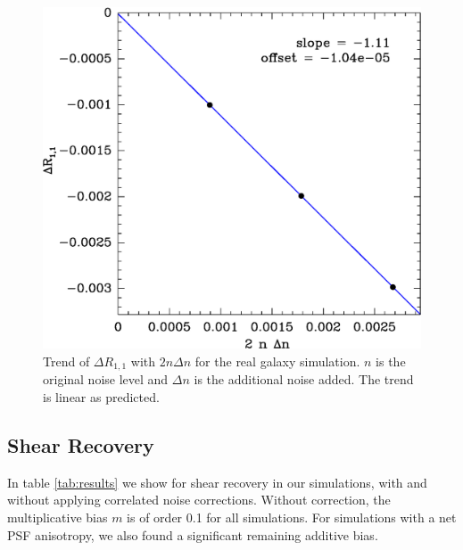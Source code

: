 \documentclass[usegraphicx,usenatbib]{mn2e}
\begin{document}
\begin{figure}
    \includegraphics[scale=0.45]{mcal-v14s01-Rnoise-detrend-R11.eps}

    \caption{Trend of $\Delta R_{1,1}$ with $2 n \Delta n$ for the
        real galaxy simulation.   $n$ is the
    original noise level and $\Delta n$ is the additional noise added.  The
    trend is linear as predicted.}

\label{fig:detrend}
\end{figure}


\subsection{Shear Recovery}


In table \ref{tab:results} we show for shear recovery in our simulations, with
and without applying correlated noise corrections.  Without correction, the
multiplicative bias $m$ is of order 0.1 for all simulations.  For simulations
with a net PSF anisotropy, we also found a significant remaining additive bias.
\end{document}
